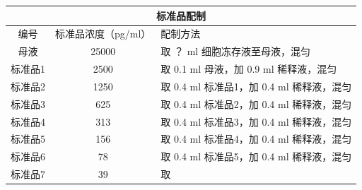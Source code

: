 \documentclass[UTF8,10pt,a4paper,fontset=fandol]{ctexart}
\newcommand{\fieldvalue}[1]{#1}
\newcommand{\handwritten}[1]{#1}
\begin{document}
\begin{tabularx}{\textwidth}{|c|c|X|}
\hline
\multicolumn{3}{|c|}{标准品配制}\\ \hline
编号 & 标准品浓度（pg/ml） & 配制方法 \\ \hline
母液 & 25000 &
取
\fieldvalue{\handwritten{？}}
ml 细胞冻存液至母液，混匀
\\ \hline
标准品1 & 2500 &
取
\fieldvalue{\handwritten{0.1}}
ml 母液，加
\fieldvalue{\handwritten{0.9}}
ml 稀释液，混匀
\\ \hline
标准品2 & 1250 &
取
\fieldvalue{\handwritten{0.4}}
ml 标准品1，加
\fieldvalue{\handwritten{0.4}}
ml 稀释液，混匀
\\ \hline
标准品3 & 625 &
取
\fieldvalue{\handwritten{0.4}}
ml 标准品2，加
\fieldvalue{\handwritten{0.4}}
ml 稀释液，混匀
\\ \hline
标准品4 & 313 &
取
\fieldvalue{\handwritten{0.4}}
ml 标准品3，加
\fieldvalue{\handwritten{0.4}}
ml 稀释液，混匀
\\ \hline
标准品5 & 156 &
取
\fieldvalue{\handwritten{0.4}}
ml 标准品4，加
\fieldvalue{\handwritten{0.4}}
ml 稀释液，混匀
\\ \hline
标准品6 & 78 &
取
\fieldvalue{\handwritten{0.4}}
ml 标准品5，加
\fieldvalue{\handwritten{0.4}}
ml 稀释液，混匀
\\ \hline
标准品7 & 39 &
取

\end{tabularx}
\end{document}
